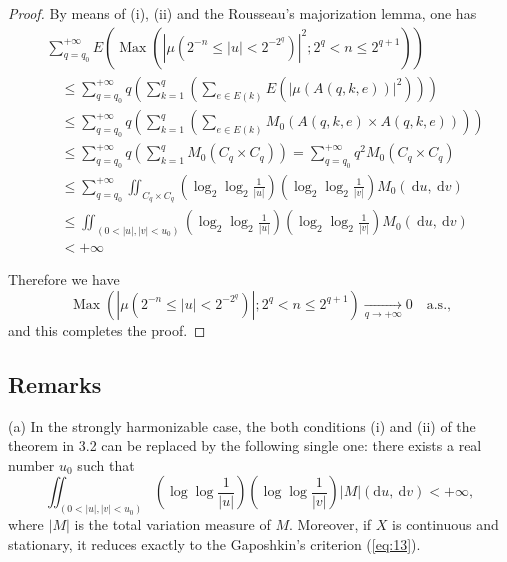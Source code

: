 \documentclass{article}
\theoremstyle{definition}
\begin{document}
\begin{proof}
By means of (i), (ii) and the Rousseau's majorization lemma, one has
\begin{equation}\label{eq:42}
\begin{aligned}
&\sum_{q=q_{0}}^{+\infty} E\left(\operatorname{Max}\left(\left|\mu\left(2^{-n} \leqslant|u|<2^{-2^{q}}\right)\right|^{2} ; 2^{q}<n \leqslant 2^{q+1}\right)\right) \\
&\quad \leqslant \sum_{q=q_{0}}^{+\infty} q\left(\sum_{k=1}^{q}\left(\sum_{e \in E(k)} E\left(|\mu(A(q, k, e))|^{2}\right)\right)\right) \\
&\quad \leqslant \sum_{q=q_{0}}^{+\infty} q\left(\sum_{k=1}^{q}\left(\sum_{e \in E(k)} M_{0}(A(q, k, e) \times A(q, k, e))\right)\right) \\
&\quad \leqslant \sum_{q=q_{0}}^{+\infty} q\left(\sum_{k=1}^{q} M_{0}\left(C_{q} \times C_{q}\right)\right)=\sum_{q=q_{0}}^{+\infty} q^{2} M_{0}\left(C_{q} \times C_{q}\right) \\
&\quad \leqslant \sum_{q=q_{0}}^{+\infty} \iint_{C_{q} \times C_{q}}\left(\log_{2} \log_{2} \frac{1}{|u|}\right)\left(\log_{2} \log_{2} \frac{1}{|v|}\right) M_{0}(\mathrm{~d} u, \mathrm{~d} v) \\
&\quad \leqslant \iint_{\left(0<|u|,|v|<u_{0}\right)}\left(\log_{2} \log_{2} \frac{1}{|u|}\right)\left(\log_{2} \log_{2} \frac{1}{|v|}\right) M_{0}(\mathrm{~d} u, \mathrm{~d} v) \\
&\quad<+\infty
\end{aligned}
\end{equation}

Therefore we have
\begin{equation}\label{eq:43}
\operatorname{Max}\left(\left|\mu\left(2^{-n} \leqslant|u|<2^{-2^{q}}\right)\right| ; 2^{q}<n \leqslant 2^{q+1}\right) \underset{q \rightarrow+\infty}{\longrightarrow} 0 \quad \text{a.s.,}
\end{equation}
and this completes the proof.
\end{proof}

\subsection{Remarks}

(a) In the strongly harmonizable case, the both conditions (i) and (ii) of the theorem in 3.2 can be replaced by the following single one: there exists a real number $u_{0}$ such that
\begin{equation}\label{eq:44}
\iint_{\left(0<|u|,|v|<u_{0}\right)}\left(\log \log \frac{1}{|u|}\right)\left(\log \log \frac{1}{|v|}\right)|M|(\mathrm{d} u, \mathrm{~d} v)<+\infty,
\end{equation}
where $|M|$ is the total variation measure of $M$. Moreover, if $X$ is continuous and stationary, it reduces exactly to the Gaposhkin's criterion (\ref{eq:13}).
\end{document}
